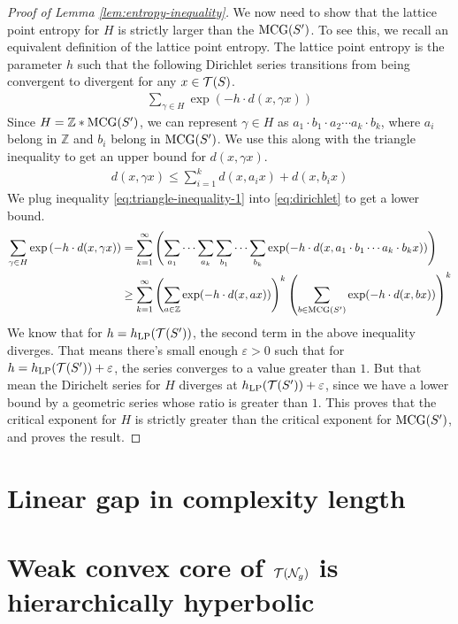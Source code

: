 \documentclass[12pt, reqno]{amsart}
\begin{document}
\begin{proof}[Proof of Lemma \ref{lem:entropy-inequality}]
  We now need to show that the lattice point entropy for $H$ is strictly larger than the $\mathrm{MCG}(S^{\prime})$.
  To see this, we recall an equivalent definition of the lattice point entropy.
  The lattice point entropy is the parameter $h$ such that the following Dirichlet series transitions from being convergent to divergent for any $x \in \mathcal{T}(S)$.
  \begin{align}
    \label{eq:dirichlet}
    \sum_{\gamma \in H} \exp\left( -h \cdot d(x, \gamma x) \right)
  \end{align}
  Since $H = \mathbb{Z} * \mathrm{MCG}(S^{\prime})$, we can represent $\gamma \in H$ as $a_1 \cdot b_1 \cdot a_2 \cdots a_k \cdot b_k$, where $a_i$ belong in $\mathbb{Z}$ and $b_i$ belong in $\mathrm{MCG}(S^{\prime})$.
  We use this along with the triangle inequality to get an upper bound for $d(x, \gamma x)$.
  \begin{align}
    \label{eq:triangle-inequality-1}
    d(x, \gamma x) \leq \sum_{i=1}^k d(x, a_i x) + d(x, b_i x)
  \end{align}
  We plug inequality \eqref{eq:triangle-inequality-1} into \eqref{eq:dirichlet} to get a lower bound.
  \begin{align}
    \label{eq:dirichlet-lower-bound}
    \sum_{\gamma \in H} \exp\left( -h \cdot d(x, \gamma x) \right) &= \sum_{k=1}^\infty \left(  \sum_{a_1}\cdots \sum_{a_k} \sum_{b_1}\cdots \sum_{b_k}  \exp(-h \cdot d(x, a_1 \cdot b_1 \cdots a_k \cdot b_k x)) \right) \\
    &\geq \sum_{k=1}^{\infty} \left( \sum_{a \in \mathbb{Z}} \exp(-h \cdot d(x, ax)) \right)^k \left( \sum_{b \in \mathrm{MCG}(S^{\prime})} \exp(-h \cdot d(x, bx)) \right)^k
  \end{align}
  We know that for $h = h_{\mathrm{LP}}(\mathcal{T}(S^{\prime}))$, the second term in the above inequality diverges.
  That means there's small enough $\varepsilon > 0$ such that for $h = h_{\mathrm{LP}}(\mathcal{T}(S^{\prime})) + \varepsilon$, the series converges to a value greater than $1$.
  But that mean the Dirichelt series for $H$ diverges at $h_{\mathrm{LP}}(\mathcal{T}(S^{\prime})) + \varepsilon$, since we have a lower bound by a geometric series whose ratio is greater than $1$.
  This proves that the critical exponent for $H$ is strictly greater than the critical exponent for $\mathrm{MCG}(S^{\prime})$, and proves the result.
\end{proof}

\section{Linear gap in complexity length}
\label{sec:line-gap-compl}



\appendix

\section{Weak convex core of $\mathcal{T}(\mathcal{N}_g)$ is hierarchically hyperbolic}
\label{sec:trunc-teichm-space}

\printbibliography
\end{document}
